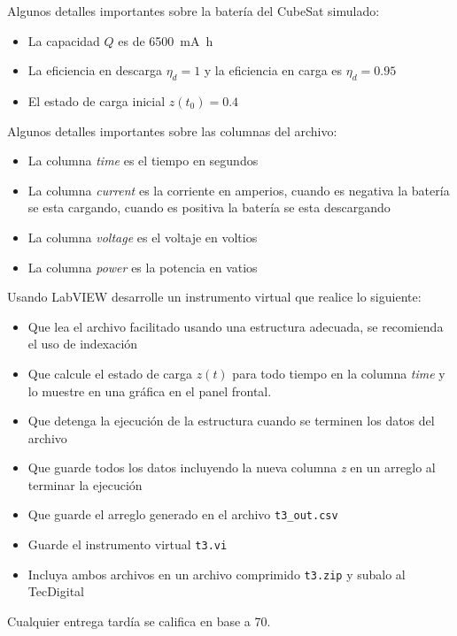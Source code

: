 \documentclass[12pt]{article}
\begin{document}
Algunos detalles importantes sobre la batería del CubeSat simulado:
\begin{itemize}
    \item La capacidad $Q$ es de \SI{6500}{\milli\ampere\hour}
    \item La eficiencia en descarga $\eta_d = 1$ y la eficiencia en carga es $\eta_d = 0.95$
    \item El estado de carga inicial $z(t_0)=0.4$ 
\end{itemize}

Algunos detalles importantes sobre las columnas del archivo:
\begin{itemize}
    \item La columna \emph{time} es el tiempo en segundos
    \item La columna \emph{current} es la corriente en amperios, cuando es negativa la batería se esta cargando, cuando es positiva la batería se esta descargando
    \item La columna \emph{voltage} es el voltaje en voltios
    \item La columna \emph{power} es la potencia en vatios
\end{itemize}

Usando LabVIEW desarrolle un instrumento virtual que realice lo siguiente:

\begin{itemize}
    \item Que lea el archivo facilitado usando una estructura adecuada, se recomienda el uso de indexación
    \item Que calcule el estado de carga $z(t)$ para todo tiempo en la columna \emph{time} y lo muestre en una gráfica en el panel frontal. 
    \item Que detenga la ejecución de la estructura cuando se terminen los datos del archivo
    \item Que guarde todos los datos incluyendo la nueva columna \emph{z} en un arreglo al terminar la ejecución
    \item Que guarde el arreglo generado en el archivo \verb+t3_out.csv+
    \item Guarde el instrumento virtual \verb+t3.vi+
    \item Incluya ambos archivos en un archivo comprimido \verb+t3.zip+ y subalo al TecDigital
\end{itemize}

Cualquier entrega tardía se califica en base a 70. 


% 
% 
\end{document}
